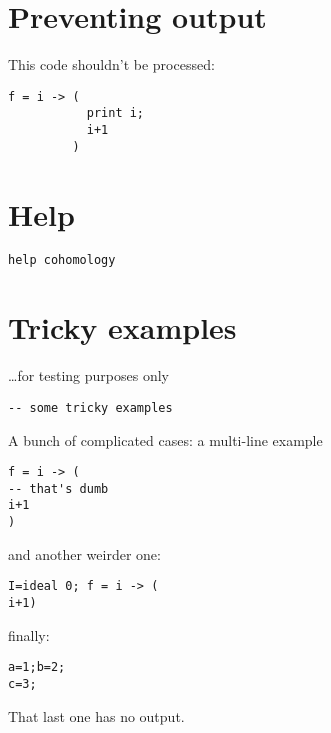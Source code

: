 \documentclass[12pt,a4paper]{amsart}
\begin{document}
\section{Preventing output}
This code shouldn't be processed:
\begin{lstlisting}[language=Macaulay2noparse]
f = i -> (
           print i;
           i+1
         )
\end{lstlisting}

\section{Help}
\begin{lstlisting}[language=Macaulay2]
help cohomology
\end{lstlisting}

\section{Tricky examples}
\dots for testing purposes only
\begin{lstlisting}[language=Macaulay2]
-- some tricky examples
\end{lstlisting}
A bunch of complicated cases: a multi-line example
\begin{lstlisting}[language=Macaulay2]
f = i -> (
-- that's dumb
i+1
)
\end{lstlisting}
and another weirder one:
\begin{lstlisting}[language=Macaulay2]
I=ideal 0; f = i -> (
i+1)
\end{lstlisting}
finally:
\begin{lstlisting}[language=Macaulay2]
a=1;b=2;
c=3;
\end{lstlisting}
That last one has no output.
\end{document}
